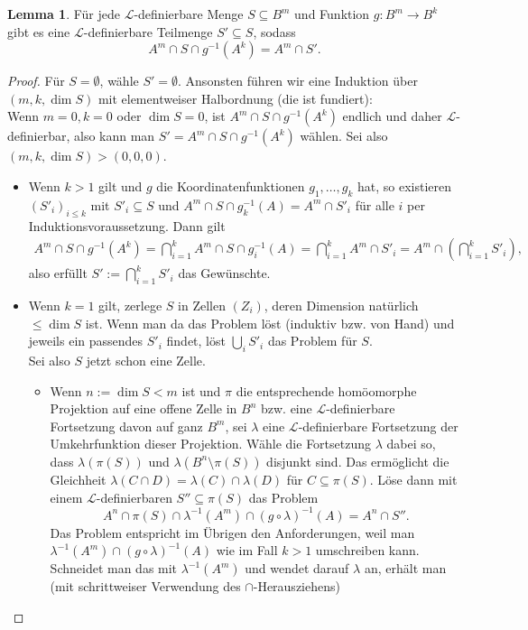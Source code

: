 \documentclass[a4paper, 11pt]{report}
\newcommand{\lingua}{\mathcal{L}}
\theoremstyle{definition}
\newtheorem{lemma}[subsection]{Lemma}
\begin{document}
\begin{lemma}
	Für jede $\lingua$-definierbare Menge $S\subseteq B^m$ und Funktion $g:B^m\rightarrow B^k$ gibt es eine $\lingua$-definierbare Teilmenge $S'\subseteq S$, sodass $$A^m\cap S\cap g^{-1}(A^k)=A^m\cap S'.$$
\end{lemma}
\begin{proof}
	Für $S=\emptyset$, wähle $S'=\emptyset$. Ansonsten führen wir eine Induktion über $(m,k,\dim S)$ mit elementweiser Halbordnung (die ist fundiert):\\
	Wenn $m=0,k=0$ oder $\dim S=0$, ist $A^m\cap S\cap g^{-1}(A^k)$ endlich und daher $\lingua$-definierbar, also kann man $S'=A^m\cap S\cap g^{-1}(A^k)$ wählen. Sei also $(m,k,\dim S)>(0,0,0)$.
	\begin{itemize}
		\item Wenn $k>1$ gilt und $g$ die Koordinatenfunktionen $g_1,\dots,g_k$ hat, so existieren $(S'_i)_{i\leq k}$ mit $S'_i\subseteq S$ und $A^m\cap S\cap g_k^{-1}(A)=A^m\cap S'_i$ für alle $i$ per Induktionsvoraussetzung. Dann gilt
		\begin{align*}
		A^m\cap S\cap g^{-1}(A^k)=\bigcap\limits_{i=1}^k A^m\cap S\cap g_i^{-1}(A)=\bigcap\limits_{i=1}^k A^m\cap S'_i=A^m\cap(\bigcap\limits_{i=1}^k S'_i),
		\end{align*}
		also erfüllt $S':=\bigcap\limits_{i=1}^k S'_i$ das Gewünschte.
		\item Wenn $k=1$ gilt, zerlege $S$ in Zellen $(Z_i)$, deren Dimension natürlich $\leq\dim S$ ist. Wenn man da das Problem löst (induktiv bzw. von Hand) und jeweils ein passendes $S'_i$ findet, löst $\bigcup\limits_i S'_i$ das Problem für $S$.\\ Sei also $S$ jetzt schon eine Zelle.
		\begin{itemize}
			\item Wenn $n:=\dim S<m$ ist und $\pi$ die entsprechende homöomorphe Projektion auf eine offene Zelle in $B^n$  bzw. eine $\lingua$-definierbare Fortsetzung davon auf ganz $B^m$, sei $\lambda$ eine $\lingua$-definierbare Fortsetzung der Umkehrfunktion dieser Projektion. Wähle die Fortsetzung $\lambda$ dabei so, dass $\lambda(\pi(S))$ und $\lambda(B^n\setminus\pi(S))$ disjunkt sind. Das ermöglicht die Gleichheit $\lambda(C\cap D)=\lambda(C)\cap\lambda(D)$ für $C\subseteq\pi(S)$. Löse dann mit einem $\lingua$-definierbaren $S''\subseteq \pi(S)$ das Problem $$A^n\cap\pi(S)\cap\lambda^{-1}(A^m)\cap (g\circ\lambda)^{-1}(A)=A^n\cap S''.$$
			Das Problem entspricht im Übrigen den Anforderungen, weil man\linebreak $\lambda^{-1}(A^m)\cap (g\circ\lambda)^{-1}(A)$ wie im Fall $k>1$ umschreiben kann. Schneidet man das mit $\lambda^{-1}(A^m)$ und wendet darauf $\lambda$ an, erhält man (mit schrittweiser Verwendung des $\cap$-Herausziehens)

\end{itemize}
\end{itemize}
\end{proof}
\end{document}
